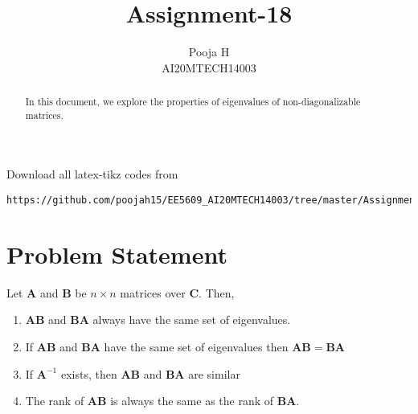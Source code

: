 \documentclass[journal,12pt,twocolumn]{IEEEtran}
\begin{document}
	\makeatother
	\let\StandardTheFigure\thefigure
	\let\vec\mathbf
	\renewcommand{\thefigure}{\theproblem}
	\def\putbox#1#2#3{\makebox[0in][l]{\makebox[#1][l]{}\raisebox{\baselineskip}[0in][0in]{\raisebox{#2}[0in][0in]{#3}}}}
	\def\rightbox#1{\makebox[0in][r]{#1}}
	\def\centbox#1{\makebox[0in]{#1}}
	\def\topbox#1{\raisebox{-\baselineskip}[0in][0in]{#1}}
	\def\midbox#1{\raisebox{-0.5\baselineskip}[0in][0in]{#1}}
	\vspace{3cm}
	\title{Assignment-18}
	\author{Pooja H \\ AI20MTECH14003}
	\maketitle
	\newpage
	\bigskip
	\renewcommand{\thefigure}{\theenumi}
	\renewcommand{\thetable}{\theenumi}
	\begin{abstract}
		In this document, we explore the properties of eigenvalues of non-diagonalizable matrices.
	\end{abstract}
	Download all latex-tikz codes from 
\begin{lstlisting}
https://github.com/poojah15/EE5609_AI20MTECH14003/tree/master/Assignment_18
\end{lstlisting}
	\section{Problem Statement}

Let $\vec{A}$ and $\vec{B}$ be $n \times n$ matrices over $\vec{C}$. Then,
\begin{enumerate}
	\item $\vec{AB}$ and $\vec{BA}$ always have the same set of eigenvalues.
	\item If $\vec{AB}$ and $\vec{BA}$ have the same set of eigenvalues then $\vec{AB=BA}$
	\item If $\vec{A}^{-1}$ exists, then $\vec{AB}$ and $\vec{BA}$ are similar
	\item The rank of $\vec{AB}$  is always the same as the rank of $\vec{BA}$.
\end{enumerate}
\end{document}
